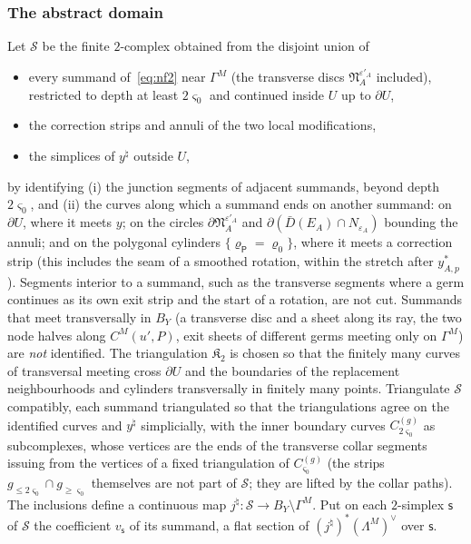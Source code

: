\subsubsection*{The abstract domain}
Let $\mathscr S$ be the finite $2$-complex obtained from the disjoint union of
\begin{itemize}
\item every summand of~\eqref{eq:nf2} near $\Gamma^M$ (the transverse discs $\mathfrak N^{\varepsilon'_A}_A$ included),
restricted to depth at least $2\varsigma_0$ and continued inside $U$ up to $\partial U$,
\item the correction strips and annuli of the two local modifications,
\item the simplices of $y^\natural$ outside $U$,
\end{itemize}
by identifying (i) the junction segments of adjacent summands, beyond depth $2\varsigma_0$, and (ii) the curves along
which a summand ends on another summand: on $\partial U$, where it meets $y$; on the circles
$\partial\mathfrak N^{\varepsilon'_A}_A$ and $\partial(\bar D(E_A)\cap N_{\varepsilon_A})$ bounding the annuli; and on the
polygonal cylinders $\{\varrho_{\mathsf P}=\varrho_0\}$, where it meets a correction strip (this includes the seam of a
smoothed rotation, within the stretch after $y^*_{A,p}$). Segments interior to a summand, such as the transverse
segments where a germ continues as its own exit strip and the start of a rotation, are not cut. Summands that meet
transversally in $B_Y$ (a transverse disc and a sheet along its ray, the two node halves along $C^M(u',P)$, exit sheets of
different germs meeting only on $\Gamma^M$) are \emph{not} identified. The triangulation $\mathfrak K_2$ is chosen so that
the finitely many curves of transversal meeting cross $\partial U$ and the boundaries of the replacement neighbourhoods and
cylinders transversally in finitely many points. Triangulate $\mathscr S$ compatibly, each summand triangulated so that
the triangulations agree on the identified curves and $y^\natural$ simplicially, with the inner boundary curves
$C^{(g)}_{2\varsigma_0}$ as subcomplexes, whose vertices are the ends of the transverse collar segments issuing from the
vertices of a fixed triangulation of $C^{(g)}_{\varsigma_0}$ (the strips $g_{\le2\varsigma_0}\cap g_{\ge\varsigma_0}$ themselves are
not part of $\mathscr S$; they are lifted by the collar paths). The
inclusions define a continuous map $j^\natural\colon\mathscr S\to B_Y\setminus\Gamma^M$. Put on each $2$-simplex $\mathsf s$ of
$\mathscr S$ the coefficient $v_{\mathsf s}$ of its summand, a flat section of $(j^\natural)^*(\Lambda^M)^\vee$ over $\mathsf s$.

